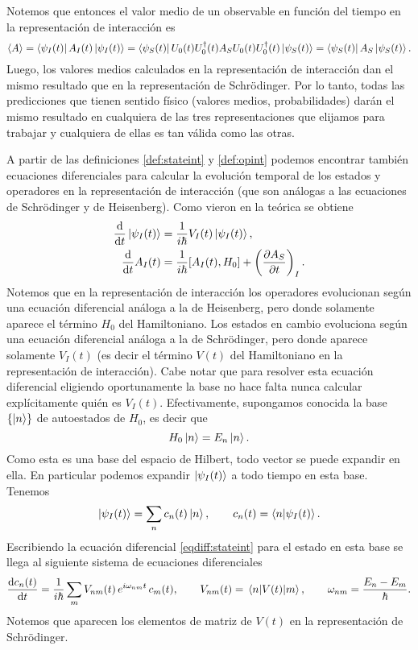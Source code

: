\documentclass[10pt, a4paper]{article}
\numberwithin{equation}{subsection}
\begin{document}
Notemos que entonces el valor medio de un observable en función del tiempo en
la representación de interacción es
\begin{equation}
  \expval{A}
  = \bra{\psi_I(t)} A_I(t) \ket{\psi_I(t)}
  = \bra{\psi_S(t)} U_0(t) U^\dagger_0(t) A_{S} U_0(t) U^\dagger_0(t)
    \ket{\psi_S(t)}
  = \bra{\psi_S(t)} A_{S} \ket{\psi_S(t)}.
\end{equation}
Luego, los valores medios calculados en la representación de interacción dan el
mismo resultado que en la representación de Schrödinger. Por lo tanto, todas
las predicciones que tienen sentido físico (valores medios, probabilidades)
darán el mismo resultado en cualquiera de las tres representaciones que
elijamos para trabajar y cualquiera de ellas es tan válida como las otras.

\bigbreak

A partir de las definiciones \eqref{def:stateint} y \eqref{def:opint} podemos
encontrar también ecuaciones diferenciales para calcular la evolución temporal
de los estados y operadores en la representación de interacción (que son
análogas a las ecuaciones de Schrödinger y de Heisenberg). Como vieron en la
teórica se obtiene
\begin{align}
  \dv{t}\ket{\psi_I(t)} &= \frac{1}{i\hbar} V_{I}(t)\ket{\psi_I(t)},
    \label{eqdiff:stateint} \\
  \dv{t} A_{I}(t) &= \frac{1}{i\hbar}\comm{A_{I}(t)}{H_0} +
    \left(\pdv{A_{S}}{t}\right)_{I}. \label{eqdiff:opint}
\end{align}
Notemos que en la representación de interacción los operadores evolucionan
según una ecuación diferencial análoga a la de Heisenberg, pero donde solamente
aparece el término $H_0$ del Hamiltoniano.
Los estados en cambio evoluciona según una ecuación diferencial análoga a la de
Schrödinger, pero donde aparece solamente $V_I(t)$ (es decir el término $V(t)$
del Hamiltoniano en la representación de interacción). Cabe notar que para
resolver esta ecuación diferencial eligiendo oportunamente la base no hace
falta nunca calcular explícitamente quién es $V_I(t)$. Efectivamente,
supongamos conocida la base $\set{\ket{n}}$ de autoestados de $H_0$, es decir
que
\begin{equation}
  H_0\ket{n} = E_n\ket{n}.
\end{equation}
Como esta es una base del espacio de Hilbert, todo vector se puede expandir en
ella. En particular podemos expandir $\ket{\psi_I(t)}$ a todo tiempo en esta
base. Tenemos
\begin{equation}
  \ket{\psi_I(t)} = \sum_{n} c_n(t)\ket{n}, \qquad c_n(t) =
    \braket{n}{\psi_I(t)}.
\end{equation}
Escribiendo la ecuación diferencial \eqref{eqdiff:stateint} para el estado en
esta base se llega al siguiente sistema de ecuaciones diferenciales
\begin{equation}
  \dv{c_n(t)}{t} = \frac{1}{i\hbar}\sum_{m} V_{nm}(t) \,
    e^{i\omega_{nm}t} \, c_m(t),
    \qquad V_{nm}(t) = \matrixel{n}{V(t)}{m},
    \qquad \omega_{nm} = \frac{E_n - E_m}{\hbar}.
\end{equation}
Notemos que aparecen los elementos de matriz de $V(t)$ en la representación de
Schrödinger.
\end{document}
